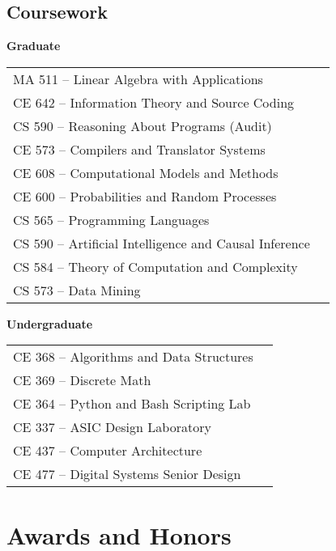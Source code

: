 \documentclass[10pt,a4paper,sans]{moderncv}        %
\begin{document}
\begin{itemize}
\vspace{4pt}

\end{itemize}

\subsection{Coursework}
\begin{minipage}[t]{0.45\linewidth}
  \raggedright
  \textbf{Graduate}
  \begin{tabular}{ll}
    MA 511 -- Linear Algebra with Applications \\
    CE 642 -- Information Theory and Source Coding \\
    CS 590 -- Reasoning About Programs (Audit) \\
    CE 573 -- Compilers and Translator Systems \\
    CE 608 -- Computational Models and Methods \\
    CE 600 -- Probabilities and Random Processes \\
    CS 565 -- Programming Languages \\
    CS 590 -- Artificial Intelligence and Causal Inference \\
    CS 584 -- Theory of Computation and Complexity \\
    CS 573 -- Data Mining \\
  \end{tabular}
\end{minipage}
\hfill
\begin{minipage}[t]{0.45\linewidth}
  \raggedright
  \textbf{Undergraduate}
  \begin{tabular}{ll}
    CE 368 -- Algorithms and Data Structures \\
    CE 369 -- Discrete Math \\
    CE 364 -- Python and Bash Scripting Lab \\
    CE 337 -- ASIC Design Laboratory \\
    CE 437 -- Computer Architecture \\
    CE 477 -- Digital Systems Senior Design \\
  \end{tabular}
\end{minipage}

\section{Awards and Honors}
\end{document}
